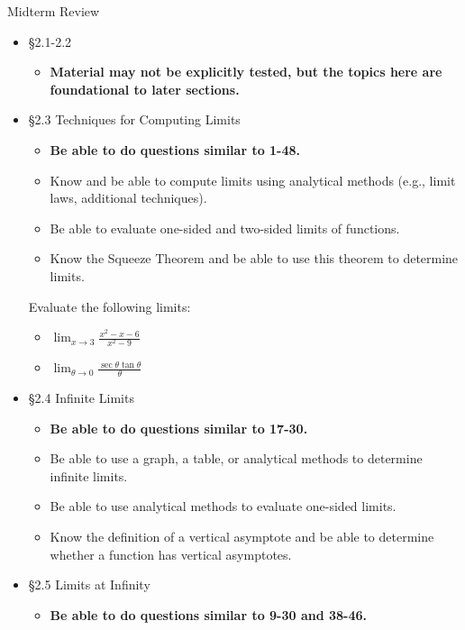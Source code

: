 \documentclass[cal1spr16Lectures.tex]{subfiles}
\begin{document}
\begin{frame}[allowframebreaks]{Midterm Review}\footnotesize
\begin{itemize}
\item \S 2.1-2.2 
	\begin{itemize}\footnotesize
	\item {\bf Material may not be explicitly tested, but the topics here are foundational to later sections.}
	\end{itemize}
\item \S 2.3 Techniques for Computing Limits
	\begin{itemize}\footnotesize
	\item {\bf Be able to do questions similar to 1-48.}
	\item Know and be able to compute limits using analytical methods (e.g., limit laws, additional techniques).
	\item Be able to evaluate one-sided and two-sided limits of functions.
	\item Know the Squeeze Theorem and be able to use this theorem to determine limits.
	\end{itemize}
\framebreak
\begin{exe} Evaluate the following limits:
\begin{itemize}
\item $\displaystyle\lim_{x\to 3}\frac{x^2-x-6}{x^2-9}$
\item $\displaystyle\lim_{\theta\to 0}\frac{\sec\theta\tan\theta}{\theta}$
\end{itemize}
\end{exe}
%
\framebreak
\item \S 2.4 Infinite Limits
	\begin{itemize}\footnotesize
	\item {\bf Be able to do questions similar to 17-30.}
	\item Be able to use a graph, a table, or analytical methods to determine infinite limits.
	\item Be able to use analytical methods to evaluate one-sided limits.
	\item Know the \alert{definition} of a vertical asymptote and be able to determine whether a function has vertical asymptotes.
	\end{itemize}
%
\framebreak
\item \S 2.5 Limits at Infinity
	\begin{itemize}\footnotesize
	\item {\bf Be able to do questions similar to 9-30 and 38-46.}

\end{itemize}
\end{itemize}
\end{frame}
\end{document}
